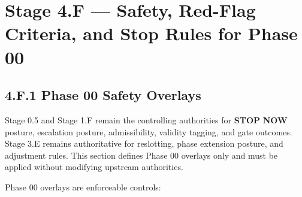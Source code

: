 \documentclass[10pt]{article}
\begin{document}
\section*{Stage 4.F — Safety, Red-Flag Criteria, and Stop Rules for Phase 00}
{}

\subsection*{4.F.1 Phase 00 Safety Overlays}
{}

Stage 0.5 and Stage 1.F remain the controlling authorities for \textbf{STOP} \textbf{NOW} posture, escalation posture, admissibility, validity tagging, and gate outcomes. Stage 3.E remains authoritative for reslotting, phase extension posture, and adjustment rules. This section defines Phase 00 overlays only and must be applied without modifying upstream authorities.

Phase 00 overlays are enforceable controls:
\end{document}

